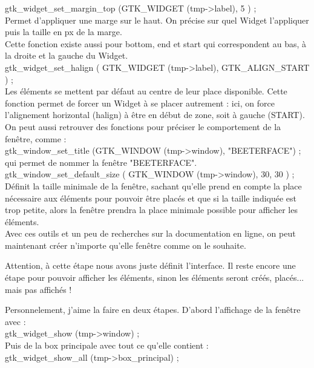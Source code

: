 \documentclass[11pt,french,a4paper]{report}
\begin{document}
 gtk\_widget\_set\_margin\_top (GTK\_WIDGET (tmp->label), 5 ) ; \\
Permet d'appliquer une marge sur le haut. On précise sur quel Widget l'appliquer puis la taille en px de la marge.\\
Cette fonction existe aussi pour bottom, end et start qui correspondent au bas, à la droite et la gauche du Widget.\\

 gtk\_widget\_set\_halign ( GTK\_WIDGET (tmp->label), GTK\_ALIGN\_START ) ;\\
Les éléments se mettent par défaut au centre de leur place disponible. Cette fonction permet 
de forcer un Widget à se placer autrement : ici, on force l'alignement horizontal (halign) à être en début de zone, 
soit à gauche (START). \\


On peut aussi retrouver des fonctions pour préciser le comportement de la fenêtre, comme : \\
 
gtk\_window\_set\_title (GTK\_WINDOW (tmp->window), "BEETERFACE") ; \\
qui permet de nommer la fenêtre "BEETERFACE". \\

gtk\_window\_set\_default\_size ( GTK\_WINDOW (tmp->window), 30, 30 ) ; \\
Définit la taille minimale de la fenêtre, sachant qu'elle prend en compte la place nécessaire aux éléments pour pouvoir 
être placés et que si la taille indiquée est trop petite, alors la fenêtre prendra la place minimale possible 
pour afficher les éléments. \\

Avec ces outils et un peu de recherches sur la documentation en ligne, on peut maintenant créer n'importe qu'elle fenêtre 
comme on le souhaite. 

Attention, à cette étape nous avons juste définit l'interface. Il reste encore une étape pour pouvoir afficher les éléments, sinon
les éléments seront créés, placés... mais pas affichés ! 

Personnelement, j'aime la faire en deux étapes. D'abord l'affichage de la fenêtre avec : \\
gtk\_widget\_show (tmp->window) ; \\

Puis de la box principale avec tout ce qu'elle contient : \\
gtk\_widget\_show\_all (tmp->box\_principal) ; \\
\end{document}
